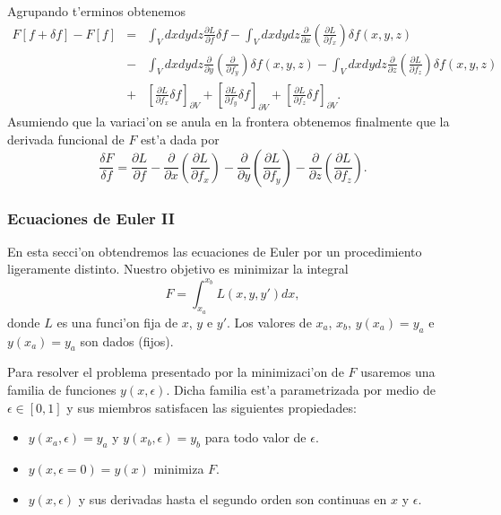 Agrupando t'erminos obtenemos
\begin{eqnarray}
F\left[ f+\delta f\right]-F\left[ f\right]&=&
\int_Vdxdydz \frac{\partial L}{\partial f}\delta f
-
\int_V dxdydz \frac{\partial}{\partial x}
\left( 
\frac{\partial L}{\partial f_x}
\right)  \delta f(x,y,z)
\nonumber
\\
&-&
\int_V dxdydz \frac{\partial}{\partial y}
\left( 
\frac{\partial }{\partial f_y}
\right)  \delta f(x,y,z)
-
\int_V dxdydz \frac{\partial}{\partial z}
\left( 
\frac{\partial L}{\partial f_z}
\right)  \delta f(x,y,z)
\nonumber
\\
&+&\left[ \frac{\partial L}{\partial f_x}\delta f\right]_{\partial V}
\nonumber
+\left[ \frac{\partial L}{\partial f_y}\delta f\right]_{\partial V}
+\left[ \frac{\partial L}{\partial f_z}\delta f\right]_{\partial V}.
\end{eqnarray}
Asumiendo que la variaci'on se anula en la frontera obtenemos finalmente que la
derivada funcional de $F$ est'a dada por
\begin{equation}
\frac{\delta F}{\delta f}=\frac{\partial L}{\partial f}
-\frac{\partial}{\partial x}\left( \frac{\partial L}{\partial f_x}\right)  
-\frac{\partial}{\partial y}\left( \frac{\partial L}{\partial f_y}\right)
-\frac{\partial}{\partial z}\left( \frac{\partial L}{\partial f_z}\right).
\end{equation}

\subsubsection{Ecuaciones de Euler II}

En esta secci'on obtendremos las ecuaciones de Euler por un procedimiento
ligeramente distinto. Nuestro objetivo es minimizar la integral
\begin{equation}
F=\int_{x_a}^{x_b} L(x,y,y')dx,
\end{equation}
donde $L$ es una funci'on fija de $x$, $y$ e $y'$. Los valores de $x_a$, $x_b$,
$y(x_a)=y_a$ e $y(x_a)=y_a$ son dados (fijos). 

Para resolver el problema presentado por la minimizaci'on de $F$ usaremos una
familia de funciones $y(x,\epsilon)$. Dicha familia est'a parametrizada por medio
de $\epsilon\in\left[0,1 \right] $ y sus miembros satisfacen las siguientes
propiedades:
\begin{itemize}
\item $y(x_a,\epsilon)=y_a$ y $y(x_b,\epsilon)=y_b$ para todo valor de
$\epsilon$.
\item $y(x,\epsilon=0)=y(x)$ minimiza $F$.
\item $y(x,\epsilon)$ y sus derivadas hasta el segundo orden son continuas en
$x$ y $\epsilon$.
\end{itemize}


